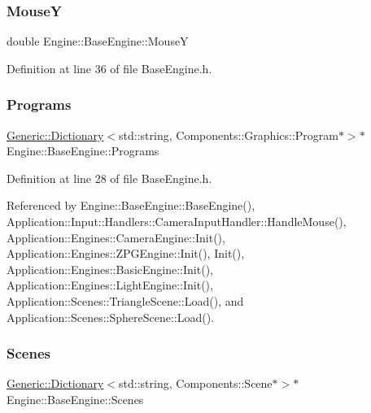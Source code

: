 \subsubsection{\texorpdfstring{MouseY}{MouseY}}
{\footnotesize\ttfamily double Engine\+::\+Base\+Engine\+::\+MouseY\hspace{0.3cm}{\ttfamily [inherited]}}



Definition at line 36 of file Base\+Engine.\+h.

\mbox{\label{classEngine_1_1BaseEngine_ae0f86360ea3a384caefe443dd8f88601}} 
\subsubsection{\texorpdfstring{Programs}{Programs}}
{\footnotesize\ttfamily \mbox{\hyperlink{classGeneric_1_1Dictionary}{Generic\+::\+Dictionary}}$<$std\+::string, Components\+::\+Graphics\+::\+Program$\ast$$>$$\ast$ Engine\+::\+Base\+Engine\+::\+Programs\hspace{0.3cm}{\ttfamily [inherited]}}



Definition at line 28 of file Base\+Engine.\+h.



Referenced by Engine\+::\+Base\+Engine\+::\+Base\+Engine(), Application\+::\+Input\+::\+Handlers\+::\+Camera\+Input\+Handler\+::\+Handle\+Mouse(), Application\+::\+Engines\+::\+Camera\+Engine\+::\+Init(), Application\+::\+Engines\+::\+Z\+P\+G\+Engine\+::\+Init(), Init(), Application\+::\+Engines\+::\+Basic\+Engine\+::\+Init(), Application\+::\+Engines\+::\+Light\+Engine\+::\+Init(), Application\+::\+Scenes\+::\+Triangle\+Scene\+::\+Load(), and Application\+::\+Scenes\+::\+Sphere\+Scene\+::\+Load().

\mbox{\label{classEngine_1_1BaseEngine_afd02af3c2fbe9bb734db014dec06585a}} 
\subsubsection{\texorpdfstring{Scenes}{Scenes}}
{\footnotesize\ttfamily \mbox{\hyperlink{classGeneric_1_1Dictionary}{Generic\+::\+Dictionary}}$<$std\+::string, Components\+::\+Scene$\ast$$>$$\ast$ Engine\+::\+Base\+Engine\+::\+Scenes\hspace{0.3cm}{\ttfamily [inherited]}}



